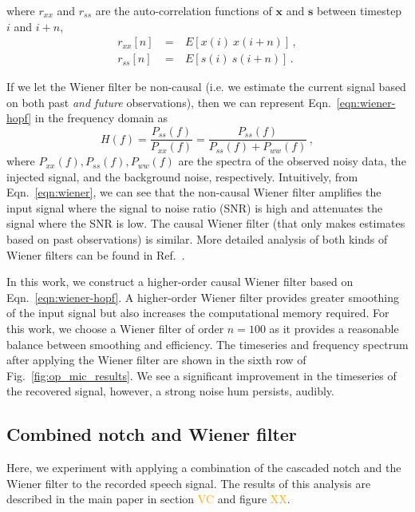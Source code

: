 \documentclass[aps,pra,superscriptaddress,reprint,nofootinbib]{revtex4-1}
\newcommand{\han}{\textcolor{orange}}
\begin{document}
where $r_{xx}$ and $r_{ss}$ are the auto-correlation functions of $\mathbf{x}$ and $\mathbf{s}$ between timestep $i$ and $i+n$, 
\begin{eqnarray} 
r_{xx}[n] &~=~& E[x(i)~x(i+n)] \,,\\
r_{ss}[n] &~=~& E[s(i)~s(i+n)] \,.
\end{eqnarray} 



If we let the Wiener filter be non-causal (i.e. we estimate the current signal based on both past \emph{and future} observations), then we can represent Eqn.~\ref{eqn:wiener-hopf} in the frequency domain as
\begin{equation}
\label{eqn:wiener}
    H(f)=\frac{P_{ss}(f)}{P_{xx}(f)}=\frac{P_{ss}(f)}{P_{ss}(f)+P_{ww}(f)}\,,
\end{equation}
where $P_{xx}(f), P_{ss}(f), P_{ww}(f)$ are the spectra of the observed noisy data, the injected signal, and the background noise, respectively. Intuitively, from Eqn.~\ref{eqn:wiener}, we can see that the non-causal Wiener filter amplifies the input signal where the signal to noise ratio (SNR) is high and attenuates the signal where the SNR is low. The causal Wiener filter (that only makes estimates based on past observations) is similar. More detailed analysis of both kinds of Wiener filters can be found in Ref.~\citep{10.5555/151045}.


In this work, we construct a higher-order causal Wiener filter based on Eqn.~\ref{eqn:wiener-hopf}. A higher-order Wiener filter provides greater smoothing of the input signal but also increases the computational memory required. For this work, we choose a Wiener filter of order $n=100$ as it provides a reasonable balance between smoothing and efficiency. The timeseries and frequency spectrum after applying the Wiener filter are shown in the sixth row of Fig.~\ref{fig:op_mic_results}.
We see a significant improvement in the timeseries of the recovered signal, however, a strong noise hum persists, audibly. 


\subsection{Combined notch and Wiener filter}

Here, we experiment with applying a combination of the cascaded notch and the Wiener filter to the recorded speech signal. 
The results of this analysis are described in the main paper in section \han{VC} and figure \han{XX}. 
\end{document}
